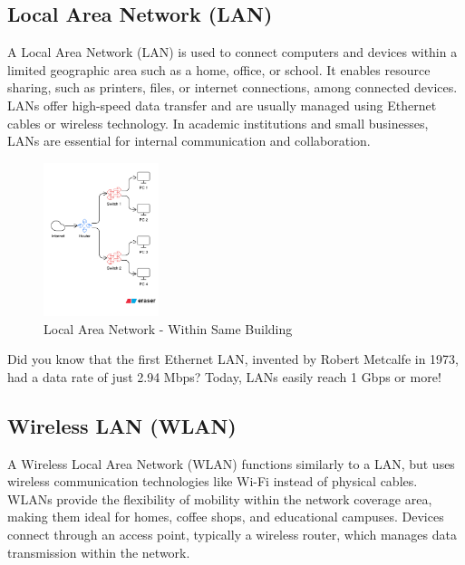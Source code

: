 \subsection{Local Area Network (LAN)}
A Local Area Network (LAN) is used to connect computers and devices within a limited geographic area such as a home, office, or school. It enables resource sharing, such as printers, files, or internet connections, among connected devices. LANs offer high-speed data transfer and are usually managed using Ethernet cables or wireless technology. In academic institutions and small businesses, LANs are essential for internal communication and collaboration.

\begin{figure}[H]
    \centering
    \includegraphics[width=0.3\textwidth]{images/chapter2/lan.png}
    \caption{Local Area Network - Within Same Building}
    \label{fig:lan}
\end{figure}


\begin{didyouknowbox}
Did you know that the first Ethernet LAN, invented by Robert Metcalfe in 1973, had a data rate of just 2.94 Mbps? Today, LANs easily reach 1 Gbps or more!
\end{didyouknowbox}


\subsection{Wireless LAN (WLAN)}
A Wireless Local Area Network (WLAN) functions similarly to a LAN, but uses wireless communication technologies like Wi-Fi instead of physical cables. WLANs provide the flexibility of mobility within the network coverage area, making them ideal for homes, coffee shops, and educational campuses. Devices connect through an access point, typically a wireless router, which manages data transmission within the network.

